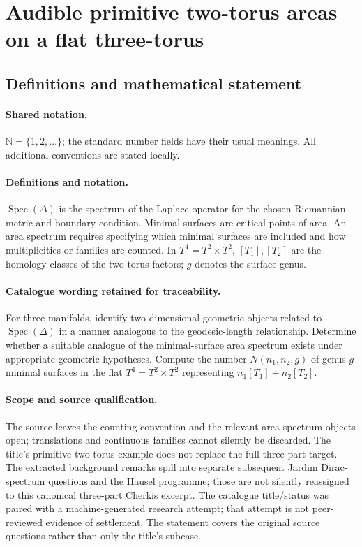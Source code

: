 \documentclass[11pt]{article}
\begin{document}
\section{Audible primitive two-torus areas on a flat three-torus}\label{statement}

\subsection{Definitions and mathematical statement}

\paragraph{Shared notation.}$\mathbb N=\{1,2,\ldots\}$; the standard number fields have their usual meanings. All additional conventions are stated locally.


\paragraph{Definitions and notation.}$\operatorname{Spec}(\Delta)$ is the spectrum of the Laplace operator for the chosen Riemannian metric and boundary condition. Minimal surfaces are critical points of area. An area spectrum requires specifying which minimal surfaces are included and how multiplicities or families are counted. In $T^4=T^2\times T^2$, $[T_1],[T_2]$ are the homology classes of the two torus factors; $g$ denotes the surface genus.

\paragraph{Catalogue wording retained for traceability.}
For three-manifolds, identify two-dimensional geometric objects related to $\operatorname{Spec}(\Delta)$ in a manner analogous to the geodesic-length relationship. Determine whether a suitable analogue of the minimal-surface area spectrum exists under appropriate geometric hypotheses. Compute the number $N(n_1,n_2,g)$ of genus-$g$ minimal surfaces in the flat $T^4=T^2\times T^2$ representing $n_1[T_1]+n_2[T_2]$.
\paragraph{Scope and source qualification.}The source leaves the counting convention and the relevant area-spectrum objects open; translations and continuous families cannot silently be discarded. The title’s primitive two-torus example does not replace the full three-part target. The extracted background remarks spill into separate subsequent Jardim Dirac-spectrum questions and the Hausel programme; those are not silently reassigned to this canonical three-part Cherkis excerpt. The catalogue title/status was paired with a machine-generated research attempt; that attempt is not peer-reviewed evidence of settlement. The statement covers the original source questions rather than only the title’s subcase.
\end{document}
